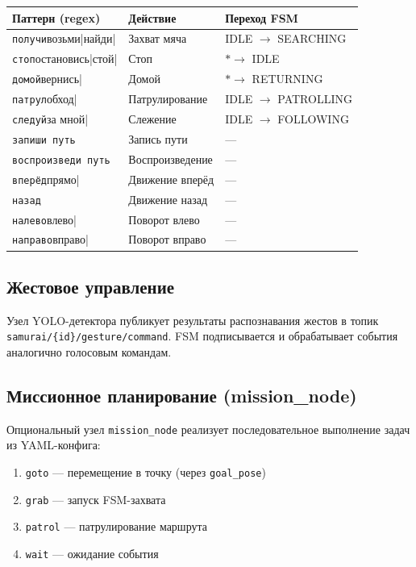 \documentclass[12pt, a4paper]{article}
\begin{document}
\begin{center}
\begin{tabular}{lll}
\toprule
\textbf{Паттерн (regex)} & \textbf{Действие} & \textbf{Переход FSM} \\
\midrule
\verb|получи|возьми|найди|    & Захват мяча  & IDLE $\to$ SEARCHING \\
\verb|стоп|остановись|стой|   & Стоп         & $* \to$ IDLE \\
\verb|домой|вернись|          & Домой        & $* \to$ RETURNING \\
\verb|патрул|обход|           & Патрулирование & IDLE $\to$ PATROLLING \\
\verb|следуй|за мной|         & Слежение     & IDLE $\to$ FOLLOWING \\
\verb|запиши путь|            & Запись пути  & — \\
\verb|воспроизведи путь|      & Воспроизведение & — \\
\verb|вперёд|прямо|           & Движение вперёд & — \\
\verb|назад|                  & Движение назад  & — \\
\verb|налево|влево|           & Поворот влево   & — \\
\verb|направо|вправо|         & Поворот вправо  & — \\
\bottomrule
\end{tabular}
\end{center}

\subsection{Жестовое управление}
Узел YOLO-детектора публикует результаты распознавания жестов в топик
\texttt{samurai/\{id\}/gesture/command}. FSM подписывается и обрабатывает события аналогично голосовым командам.

\subsection{Миссионное планирование (mission\_node)}
Опциональный узел \texttt{mission\_node} реализует последовательное выполнение задач из YAML-конфига:
\begin{enumerate}[noitemsep]
  \item \texttt{goto} — перемещение в точку (через \texttt{goal\_pose})
  \item \texttt{grab} — запуск FSM-захвата
  \item \texttt{patrol} — патрулирование маршрута
  \item \texttt{wait} — ожидание события
\end{enumerate}
\end{document}
